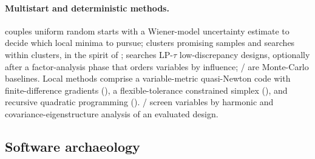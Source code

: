 \paragraph{Multistart and deterministic methods.}  couples
uniform random starts with a Wiener-model uncertainty estimate to decide
which local minima to pursue;  clusters promising samples and
searches within clusters, in the spirit of
\cite{rinnooykan1987stochastic};  searches LP-$\tau$
low-discrepancy designs, optionally after a factor-analysis phase that
orders variables by influence; / are Monte-Carlo
baselines. Local methods comprise a variable-metric quasi-Newton code
with finite-difference gradients (), a flexible-tolerance
constrained simplex (), and recursive quadratic programming
(). / screen variables by harmonic and
covariance-eigenstructure analysis of an evaluated design.

\subsection{Software archaeology}
\label{sec:archaeology}

